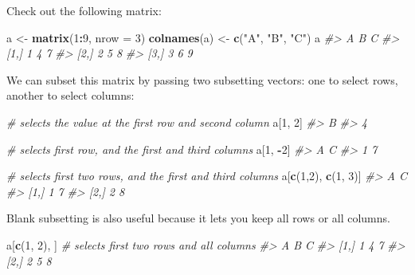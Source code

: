 \documentclass[]{book}
\newenvironment{Shaded}{\begin{snugshade}}{\end{snugshade}}
\newcommand{\KeywordTok}[1]{\textcolor[rgb]{0.13,0.29,0.53}{\textbf{#1}}}
\newcommand{\DataTypeTok}[1]{\textcolor[rgb]{0.13,0.29,0.53}{#1}}
\newcommand{\DecValTok}[1]{\textcolor[rgb]{0.00,0.00,0.81}{#1}}
\newcommand{\StringTok}[1]{\textcolor[rgb]{0.31,0.60,0.02}{#1}}
\newcommand{\CommentTok}[1]{\textcolor[rgb]{0.56,0.35,0.01}{\textit{#1}}}
\newcommand{\OperatorTok}[1]{\textcolor[rgb]{0.81,0.36,0.00}{\textbf{#1}}}
\newcommand{\NormalTok}[1]{#1}
\begin{document}
Check out the following matrix:

\begin{Shaded}
\begin{Highlighting}[]
\NormalTok{a <-}\StringTok{ }\KeywordTok{matrix}\NormalTok{(}\DecValTok{1}\OperatorTok{:}\DecValTok{9}\NormalTok{, }\DataTypeTok{nrow =} \DecValTok{3}\NormalTok{)}
\KeywordTok{colnames}\NormalTok{(a) <-}\StringTok{ }\KeywordTok{c}\NormalTok{(}\StringTok{"A"}\NormalTok{, }\StringTok{"B"}\NormalTok{, }\StringTok{"C"}\NormalTok{)}
\NormalTok{a}
\CommentTok{#>      A B C}
\CommentTok{#> [1,] 1 4 7}
\CommentTok{#> [2,] 2 5 8}
\CommentTok{#> [3,] 3 6 9}
\end{Highlighting}
\end{Shaded}

We can subset this matrix by passing two subsetting vectors: one to
select rows, another to select columns:

\begin{Shaded}
\begin{Highlighting}[]
\CommentTok{# selects the value at the first row and second column}
\NormalTok{a[}\DecValTok{1}\NormalTok{, }\DecValTok{2}\NormalTok{] }
\CommentTok{#> B }
\CommentTok{#> 4}

\CommentTok{# selects first row, and the first and third columns}
\NormalTok{a[}\DecValTok{1}\NormalTok{, }\OperatorTok{-}\DecValTok{2}\NormalTok{] }
\CommentTok{#> A C }
\CommentTok{#> 1 7}

\CommentTok{# selects first two rows, and the first and third columns}
\NormalTok{a[}\KeywordTok{c}\NormalTok{(}\DecValTok{1}\NormalTok{,}\DecValTok{2}\NormalTok{), }\KeywordTok{c}\NormalTok{(}\DecValTok{1}\NormalTok{, }\DecValTok{3}\NormalTok{)] }
\CommentTok{#>      A C}
\CommentTok{#> [1,] 1 7}
\CommentTok{#> [2,] 2 8}
\end{Highlighting}
\end{Shaded}

Blank subsetting is also useful because it lets you keep all rows or all
columns.

\begin{Shaded}
\begin{Highlighting}[]
\NormalTok{a[}\KeywordTok{c}\NormalTok{(}\DecValTok{1}\NormalTok{, }\DecValTok{2}\NormalTok{), ] }\CommentTok{# selects first two rows and all columns}
\CommentTok{#>      A B C}
\CommentTok{#> [1,] 1 4 7}
\CommentTok{#> [2,] 2 5 8}
\end{Highlighting}
\end{Shaded}
\end{document}
